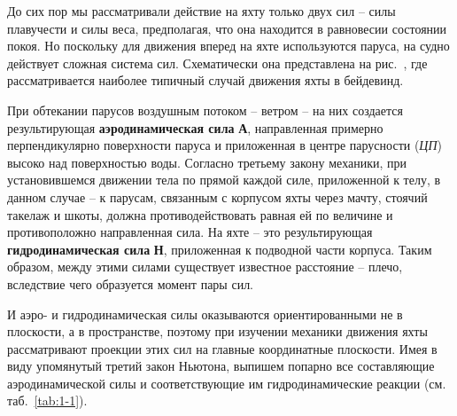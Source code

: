 До сих пор мы рассматривали действие на яхту только двух сил \--- силы
плавучести и силы веса,
предполагая, что она находится в равновесии состоянии покоя. Но
поскольку для движения вперед на яхте используются паруса, на судно
действует сложная система сил. Схематически она представлена на
рис.~, где рассматривается наиболее типичный случай движения
яхты в бейдевинд.

При обтекании парусов воздушным потоком \--- ветром \--- на них
создается результирующая \textbf{аэродинамическая
  сила} \textbf{А}, направленная примерно
перпендикулярно поверхности паруса и приложенная в центре парусности
(\textit{ЦП}) высоко над поверхностью
воды. Согласно третьему закону механики, при установившемся движении
тела по прямой каждой силе, приложенной к телу, в данном случае \--- к
парусам, связанным с корпусом яхты через мачту, стоячий такелаж и
шкоты, должна противодействовать равная ей по величине и
противоположно направленная сила. На яхте \--- это результирующая
\textbf{гидродинамическая сила}
\textbf{Н}, приложенная к подводной части корпуса. Таким образом,
между этими силами существует известное расстояние \--- плечо,
вследствие чего образуется момент пары сил.

И аэро- и гидродинамическая силы оказываются ориентированными не в
плоскости, а в пространстве, поэтому при изучении механики движения
яхты рассматривают проекции этих сил на главные координатные
плоскости. Имея в виду упомянутый третий закон Ньютона, выпишем
попарно все составляющие аэродинамической силы и соответствующие им
гидродинамические реакции (см. таб.~\ref{tab:1-1}).

